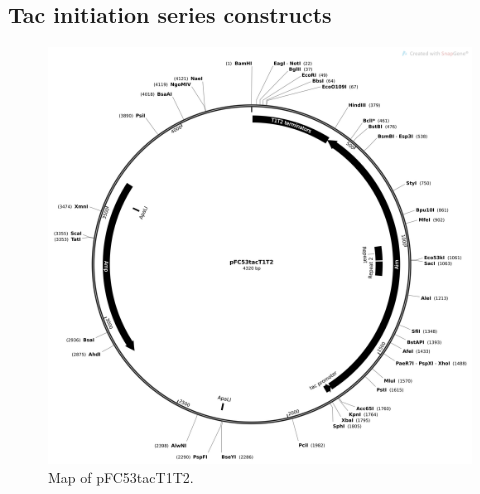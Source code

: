 \documentclass[11pt]{article}
\begin{document}
\subsection{Tac initiation series constructs}

\begin{figure}[H]
	\includegraphics[width=12cm]{images/plasmid_maps/pFC53tacT1T2_Map.png}
	\centering
	\caption{Map of pFC53tacT1T2.}
	\label{fig:pFC53tacT1T2}
\end{figure}
\end{document}
